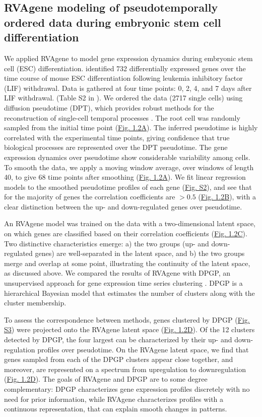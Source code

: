 \subsection{RVAgene modeling of pseudotemporally ordered data during embryonic stem cell differentiation}

We applied RVAgene to model gene expression dynamics during embryonic stem cell (ESC)
differentiation. \citet{Klein2015} identified 732 differentially expressed genes over the time
course of mouse ESC differentiation following leukemia inhibitory factor (LIF) withdrawal. Data is
gathered at four time points: 0, 2, 4, and 7 days after LIF withdrawal. (Table S2 in
\citet{Klein2015}). We ordered the data (2717 single cells) using diffusion pseudotime (DPT), which
provides robust methods for the reconstruction of single-cell temporal processes
\citep{haghverdi2016diffusion}. The root cell was randomly sampled from the initial time point
(\hyperref[fig:fig3]{Fig. 1.2A}). The inferred pseudotime is highly correlated with the experimental
time points, giving confidence that true biological processes are represented over the DPT
pseudotime. The gene expression dynamics over pseudotime show considerable variability among cells.
To smooth the data, we apply a moving window average, over windows of length 40, to give 68 time
points after smoothing (\hyperref[fig:fig3]{Fig. 1.2A}). 
We fit linear regression models to the smoothed pseudotime profiles of each gene
(\hyperref[supp]{Fig. S2}), and see that for the majority of genes the correlation coefficients are
$> 0.5$ (\hyperref[fig:fig3]{Fig. 1.2B}), with a clear distinction between the up- and down-regulated genes over pseudotime.
\par 
An RVAgene model was trained on the data with a two-dimensional latent space, on which genes are
classified based on their correlation coefficients  (\hyperref[fig:fig3]{Fig. 1.2C}). Two distinctive characteristics emerge: a) the two groups (up- and down-regulated genes) are well-separated in the latent space, and b) the two groups merge and overlap at some point, illustrating the continuity of the latent space, as discussed above. 
We compared the results of RVAgene with DPGP, an unsupervised approach for gene expression time series clustering \citep{McDowell2018}. DPGP is a hierarchical Bayesian model that estimates the number of clusters along with the cluster membership.

To assess the correspondence between methods, genes clustered by DPGP (\hyperref[supp]{Fig. S3})
were projected onto the RVAgene latent space (\hyperref[fig:fig3]{Fig. 1.2D}). Of the 12 clusters
detected by DPGP, the four largest can be characterized by their up- and down-regulation profiles
over pseudotime. On the RVAgene latent space, we find that genes sampled from each of the DPGP
clusters appear close together, and moreover, are represented on a spectrum from upregulation to
downregulation (\hyperref[fig:fig3]{Fig. 1.2D}). The goals of RVAgene and DPGP are to some degree complementary: DPGP characterizes gene expression profiles discretely with no need for prior information, while RVAgene characterizes profiles with a continuous representation, that can explain smooth changes in patterns.

